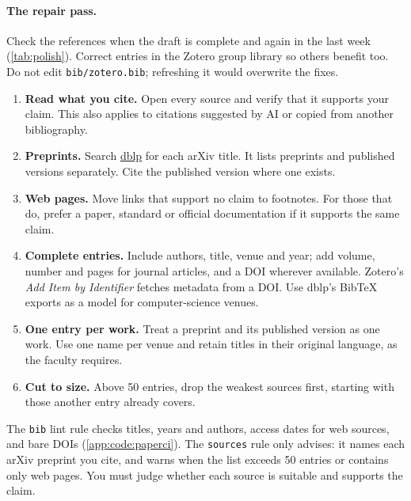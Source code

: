 \paragraph{The repair pass.} Check the references when the draft is complete and again in the last week (\cref{tab:polish}). Correct entries in the Zotero group library so others benefit too. Do not edit \texttt{bib/zotero.bib}; refreshing it would overwrite the fixes.
\begin{enumerate}
  \item \textbf{Read what you cite.} Open every source and verify that it supports your claim. This also applies to citations suggested by AI or copied from another bibliography.
  \item \textbf{Preprints.} Search \href{https://dblp.org/}{dblp} for each arXiv title. It lists preprints and published versions separately. Cite the published version where one exists.
  \item \textbf{Web pages.} Move links that support no claim to footnotes. For those that do, prefer a paper, standard or official documentation if it supports the same claim.
  \item \textbf{Complete entries.} Include authors, title, venue and year; add volume, number and pages for journal articles, and a DOI wherever available. Zotero's \emph{Add Item by Identifier} fetches metadata from a DOI. Use dblp's BibTeX exports as a model for computer-science venues.
  \item \textbf{One entry per work.} Treat a preprint and its published version as one work. Use one name per venue and retain titles in their original language, as the faculty requires.
  \item \textbf{Cut to size.} Above 50 entries, drop the weakest sources first, starting with those another entry already covers.
\end{enumerate}
The \texttt{bib} lint rule checks titles, years and authors, access dates for web sources, and bare DOIs (\cref{app:code:paperci}). The \texttt{sources} rule only advises: it names each arXiv preprint you cite, and warns when the list exceeds 50 entries or contains only web pages. You must judge whether each source is suitable and supports the claim.

